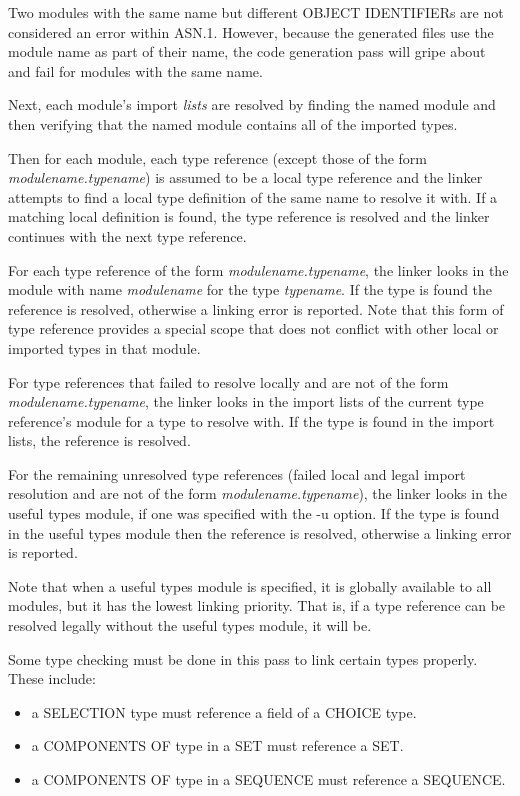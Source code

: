 Two modules with the same name but different OBJECT IDENTIFIERs are
not considered an error within ASN.1.  However, because the generated
files use the module name as part of their name, the code generation
pass will gripe about and fail for modules with the same name.

Next, each module's import {\em lists} are resolved by finding the
named module and then verifying that the named module contains all of
the imported types.

Then for each module, each type reference (except those of the form
{\em modulename.typename}) is assumed to be a local type reference and
the linker attempts to find a local type definition of the same name
to resolve it with.  If a matching local definition is found, the type
reference is resolved and the linker continues with the next type
reference.

For each type reference of the form {\em modulename.typename}, the
linker looks in the module with name {\em modulename} for the type
{\em typename}.  If the type is found the reference is resolved,
otherwise a linking error is reported.  Note that this form of type
reference provides a special scope that does not conflict with other
local or imported types in that module.

For type references that failed to resolve locally and are not of the
form {\em modulename.typename}, the linker looks in the import lists
of the current type reference's module for a type to resolve with.  If
the type is found in the import lists, the reference is resolved.

For the remaining unresolved type references (failed local and legal
import resolution and are not of the form {\em modulename.typename}),
the linker looks in the useful types module, if one was specified with
the {\ufn -u} option.  If the type is found in the useful types module
then the reference is resolved, otherwise a linking error is reported.

Note that when a useful types module is specified, it is globally
available to all modules, but it has the lowest linking priority.
That is, if a type reference can be resolved legally without the
useful types module, it will be.

Some type checking must be done in this pass to link certain types
properly.  These include:
\begin{itemize}
\item {a SELECTION type must reference a field of a CHOICE type.}
\item {a COMPONENTS OF type in a SET must reference a SET.}
\item {a COMPONENTS OF type in a SEQUENCE must reference a SEQUENCE.}
\end{itemize}



